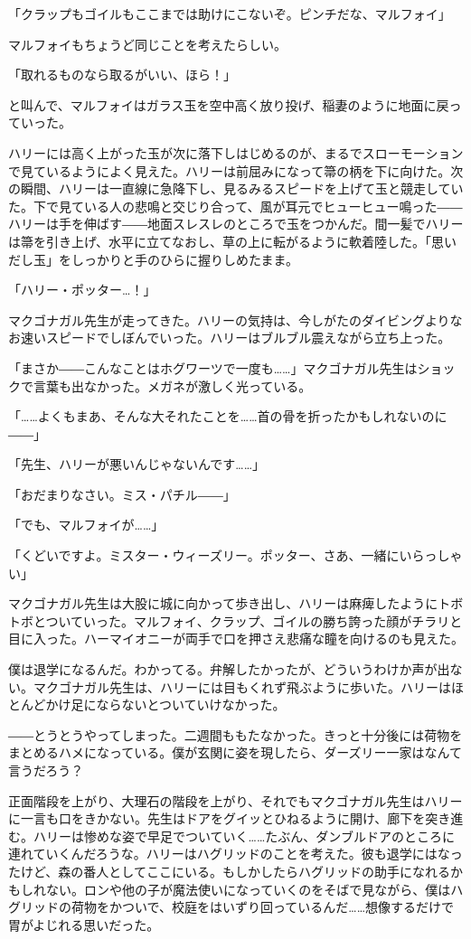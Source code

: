 \documentclass[10pt,a4paper]{article}
\begin{document}
\begin{CJK}{UTF8}{min}
「クラップもゴイルもここまでは助けにこないぞ。ピンチだな、マルフォイ」

マルフォイもちょうど同じことを考えたらしい。

「取れるものなら取るがいい、ほら！」

と叫んで、マルフォイはガラス玉を空中高く放り投げ、稲妻のように地面に戻っていった。

ハリーには高く上がった玉が次に落下しはじめるのが、まるでスローモーションで見ているようによく見えた。ハリーは前屈みになって箒の柄を下に向けた。次の瞬間、ハリーは一直線に急降下し、見るみるスピードを上げて玉と競走していた。下で見ている人の悲鳴と交じり合って、風が耳元でヒューヒュー鳴った――ハリーは手を伸ばす――地面スレスレのところで玉をつかんだ。間一髪でハリーは箒を引き上げ、水平に立てなおし、草の上に転がるように軟着陸した。「思いだし玉」をしっかりと手のひらに握りしめたまま。

「ハリー・ポッター…！」

マクゴナガル先生が走ってきた。ハリーの気持は、今しがたのダイビングよりなお速いスピードでしぼんでいった。ハリーはブルブル震えながら立ち上った。

「まさか――こんなことはホグワーツで一度も……」マクゴナガル先生はショックで言葉も出なかった。メガネが激しく光っている。

「……よくもまあ、そんな大それたことを……首の骨を折ったかもしれないのに――」

「先生、ハリーが悪いんじゃないんです……」

「おだまりなさい。ミス・パチル――」

「でも、マルフォイが……」

「くどいですよ。ミスター・ウィーズリー。ポッター、さあ、一緒にいらっしゃい」

マクゴナガル先生は大股に城に向かって歩き出し、ハリーは麻痺したようにトボトボとついていった。マルフォイ、クラップ、ゴイルの勝ち誇った顔がチラリと目に入った。ハーマイオニーが両手で口を押さえ悲痛な瞳を向けるのも見えた。

僕は退学になるんだ。わかってる。弁解したかったが、どういうわけか声が出ない。マクゴナガル先生は、ハリーには目もくれず飛ぶように歩いた。ハリーはほとんどかけ足にならないとついていけなかった。

――とうとうやってしまった。二週間ももたなかった。きっと十分後には荷物をまとめるハメになっている。僕が玄関に姿を現したら、ダーズリー一家はなんて言うだろう？

正面階段を上がり、大理石の階段を上がり、それでもマクゴナガル先生はハリーに一言も口をきかない。先生はドアをグイッとひねるように開け、廊下を突き進む。ハリーは惨めな姿で早足でついていく……たぶん、ダンブルドアのところに連れていくんだろうな。ハリーはハグリッドのことを考えた。彼も退学にはなったけど、森の番人としてここにいる。もしかしたらハグリッドの助手になれるかもしれない。ロンや他の子が魔法使いになっていくのをそばで見ながら、僕はハグリッドの荷物をかついで、校庭をはいずり回っているんだ……想像するだけで胃がよじれる思いだった。


\end{CJK}
\end{document}
